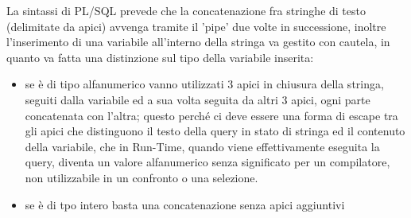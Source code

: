 La sintassi di PL/SQL prevede che la concatenazione fra stringhe di testo (delimitate da apici) avvenga tramite il 'pipe' due volte in successione, inoltre l'inserimento di una variabile all'interno della stringa va gestito con cautela, in quanto va fatta una distinzione sul tipo della variabile inserita: \\
\begin{itemize}
\item se è di tipo alfanumerico vanno utilizzati 3 apici in chiusura della stringa, seguiti dalla variabile ed a sua volta seguita da altri 3 apici, ogni parte concatenata con l'altra; questo perché ci deve essere una forma di escape tra gli apici che distinguono il testo della query in stato di stringa ed il contenuto della variabile, che in Run-Time, quando viene effettivamente eseguita la query, diventa un valore alfanumerico senza significato per un compilatore, non utilizzabile in un confronto o una selezione.\\
\item se è di tpo intero basta una concatenazione senza apici aggiuntivi
\end{itemize}

